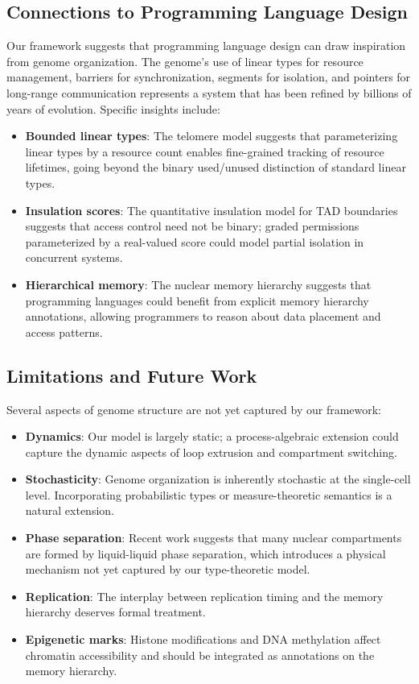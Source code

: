 \documentclass[12pt,a4paper]{article}
\theoremstyle{plain}
\theoremstyle{definition}
\begin{document}
\subsection{Connections to Programming Language Design}

Our framework suggests that programming language design can draw inspiration from genome organization. The genome's use of linear types for resource management, barriers for synchronization, segments for isolation, and pointers for long-range communication represents a system that has been refined by billions of years of evolution. Specific insights include:

\begin{itemize}
  \item \textbf{Bounded linear types}: The telomere model suggests that parameterizing linear types by a resource count enables fine-grained tracking of resource lifetimes, going beyond the binary used/unused distinction of standard linear types.
  \item \textbf{Insulation scores}: The quantitative insulation model for TAD boundaries suggests that access control need not be binary; graded permissions parameterized by a real-valued score could model partial isolation in concurrent systems.
  \item \textbf{Hierarchical memory}: The nuclear memory hierarchy suggests that programming languages could benefit from explicit memory hierarchy annotations, allowing programmers to reason about data placement and access patterns.
\end{itemize}

\subsection{Limitations and Future Work}

Several aspects of genome structure are not yet captured by our framework:

\begin{itemize}
  \item \textbf{Dynamics}: Our model is largely static; a process-algebraic extension could capture the dynamic aspects of loop extrusion and compartment switching.
  \item \textbf{Stochasticity}: Genome organization is inherently stochastic at the single-cell level. Incorporating probabilistic types or measure-theoretic semantics is a natural extension.
  \item \textbf{Phase separation}: Recent work suggests that many nuclear compartments are formed by liquid-liquid phase separation, which introduces a physical mechanism not yet captured by our type-theoretic model.
  \item \textbf{Replication}: The interplay between replication timing and the memory hierarchy deserves formal treatment.
  \item \textbf{Epigenetic marks}: Histone modifications and DNA methylation affect chromatin accessibility and should be integrated as annotations on the memory hierarchy.
\end{itemize}
\end{document}
